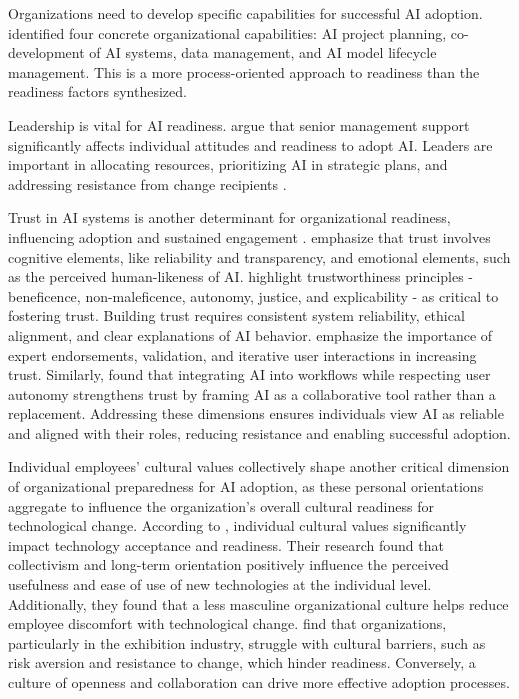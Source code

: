Organizations need to develop specific capabilities for successful AI adoption. \cite{Weber2023} identified four concrete organizational capabilities: AI project planning, co-development of AI systems, data management, and AI model lifecycle management. This is a more process-oriented approach to readiness than the readiness factors \cite{Johnk2021} synthesized.

Leadership is vital for AI readiness. \cite{Felemban2024} argue that senior management support significantly affects individual attitudes and readiness to adopt AI. Leaders are important in allocating resources, prioritizing AI in strategic plans, and addressing resistance from change recipients \citep{MikelHong2024}.

Trust in AI systems is another determinant for organizational readiness, influencing adoption and sustained engagement \citep{Tursunbayeva2024}. \cite{Glikson2020} emphasize that trust involves cognitive elements, like reliability and transparency, and emotional elements, such as the perceived human-likeness of AI. \cite{Thiebes2021} highlight trustworthiness principles - beneficence, non-maleficence, autonomy, justice, and explicability - as critical to fostering trust. Building trust requires consistent system reliability, ethical alignment, and clear explanations of AI behavior. \cite{Siau2018} emphasize the importance of expert endorsements, validation, and iterative user interactions in increasing trust. Similarly, \cite{Henry2022} found that integrating AI into workflows while respecting user autonomy strengthens trust by framing AI as a collaborative tool rather than a replacement. Addressing these dimensions ensures individuals view AI as reliable and aligned with their roles, reducing resistance and enabling successful adoption.

Individual employees' cultural values collectively shape another critical dimension of organizational preparedness for AI adoption, as these personal orientations aggregate to influence the organization's overall cultural readiness for technological change. According to \cite{Sunny2019}, individual cultural values significantly impact technology acceptance and readiness. Their research found that collectivism and long-term orientation positively influence the perceived usefulness and ease of use of new technologies at the individual level. Additionally, they found that a less masculine organizational culture helps reduce employee discomfort with technological change. \cite{Hradecky2022} find that organizations, particularly in the exhibition industry, struggle with cultural barriers, such as risk aversion and resistance to change, which hinder readiness. Conversely, a culture of openness and collaboration can drive more effective adoption processes.

